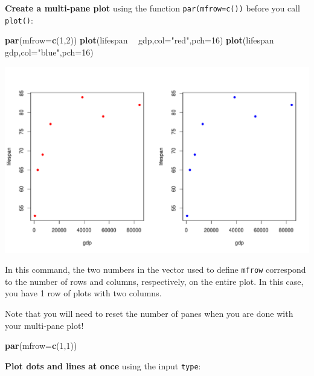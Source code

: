 \documentclass[
]{book}
\newenvironment{Shaded}{\begin{snugshade}}{\end{snugshade}}
\newcommand{\DataTypeTok}[1]{\textcolor[rgb]{0.13,0.29,0.53}{#1}}
\newcommand{\DecValTok}[1]{\textcolor[rgb]{0.00,0.00,0.81}{#1}}
\newcommand{\KeywordTok}[1]{\textcolor[rgb]{0.13,0.29,0.53}{\textbf{#1}}}
\newcommand{\NormalTok}[1]{#1}
\newcommand{\OperatorTok}[1]{\textcolor[rgb]{0.81,0.36,0.00}{\textbf{#1}}}
\newcommand{\StringTok}[1]{\textcolor[rgb]{0.31,0.60,0.02}{#1}}
\begin{document}
\textbf{Create a multi-pane plot} using the function \texttt{par(mfrow=c())} before you call \texttt{plot()}:

\begin{Shaded}
\begin{Highlighting}[]
\KeywordTok{par}\NormalTok{(}\DataTypeTok{mfrow=}\KeywordTok{c}\NormalTok{(}\DecValTok{1}\NormalTok{,}\DecValTok{2}\NormalTok{))}
\KeywordTok{plot}\NormalTok{(lifespan }\OperatorTok{~}\StringTok{ }\NormalTok{gdp,}\DataTypeTok{col=}\StringTok{"red"}\NormalTok{,}\DataTypeTok{pch=}\DecValTok{16}\NormalTok{)}
\KeywordTok{plot}\NormalTok{(lifespan }\OperatorTok{~}\StringTok{ }\NormalTok{gdp,}\DataTypeTok{col=}\StringTok{"blue"}\NormalTok{,}\DataTypeTok{pch=}\DecValTok{16}\NormalTok{)}
\end{Highlighting}
\end{Shaded}

\includegraphics{figures/unnamed-chunk-113-1.pdf}

In this command, the two numbers in the vector used to define \texttt{mfrow} correspond to the number of rows and columns, respectively, on the entire plot. In this case, you have 1 row of plots with two columns.

Note that you will need to reset the number of panes when you are done with your multi-pane plot!

\begin{Shaded}
\begin{Highlighting}[]
\KeywordTok{par}\NormalTok{(}\DataTypeTok{mfrow=}\KeywordTok{c}\NormalTok{(}\DecValTok{1}\NormalTok{,}\DecValTok{1}\NormalTok{))}
\end{Highlighting}
\end{Shaded}

\textbf{Plot dots and lines at once} using the input \texttt{type}:
\end{document}
